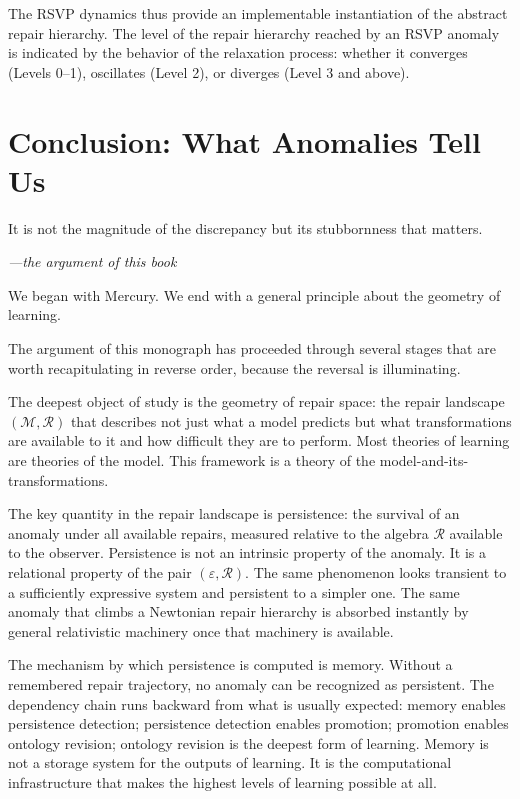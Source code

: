 \documentclass[12pt,oneside]{book}
\theoremstyle{plain}
\theoremstyle{definition}
\theoremstyle{remark}
\newcommand{\R}{\mathcal{R}}
\newcommand{\M}{\mathcal{M}}
\newcommand{\eps}{\varepsilon}
\newcommand{\1}{\mathbf{1}}
\begin{document}
The RSVP dynamics thus provide an implementable instantiation of the abstract repair hierarchy. The level of the repair hierarchy reached by an RSVP anomaly is indicated by the behavior of the relaxation process: whether it converges (Levels 0--1), oscillates (Level 2), or diverges (Level 3 and above).

\backmatter

\chapter*{Conclusion: What Anomalies Tell Us}

\epigraph{It is not the magnitude of the discrepancy but its stubbornness that matters.}{\textit{---the argument of this book}}

We began with Mercury. We end with a general principle about the geometry of learning.

The argument of this monograph has proceeded through several stages that are worth recapitulating in reverse order, because the reversal is illuminating.

The deepest object of study is the geometry of repair space: the repair landscape $(\M, \R)$ that describes not just what a model predicts but what transformations are available to it and how difficult they are to perform. Most theories of learning are theories of the model. This framework is a theory of the model-and-its-transformations.

The key quantity in the repair landscape is persistence: the survival of an anomaly under all available repairs, measured relative to the algebra $\R$ available to the observer. Persistence is not an intrinsic property of the anomaly. It is a relational property of the pair $(\eps, \R)$. The same phenomenon looks transient to a sufficiently expressive system and persistent to a simpler one. The same anomaly that climbs a Newtonian repair hierarchy is absorbed instantly by general relativistic machinery once that machinery is available.

The mechanism by which persistence is computed is memory. Without a remembered repair trajectory, no anomaly can be recognized as persistent. The dependency chain runs backward from what is usually expected: memory enables persistence detection; persistence detection enables promotion; promotion enables ontology revision; ontology revision is the deepest form of learning. Memory is not a storage system for the outputs of learning. It is the computational infrastructure that makes the highest levels of learning possible at all.
\end{document}
